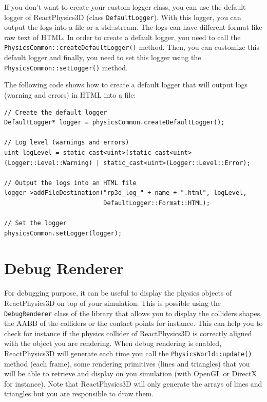 \documentclass[a4paper,12pt]{article}
\begin{document}
    \begin{sloppypar}
    If you don't want to create your custom logger class, you can use the default logger of ReactPhysics3D (class \texttt{DefaultLogger}). With this
    logger, you can output the logs into
    a file or a std::stream. The logs can have different format like raw text of HTML. In order to create a default logger, you need to call the
    \texttt{PhysicsCommon::createDefaultLogger()} method. Then, you can customize this default logger and finally, you need to set this logger using the
    \texttt{PhysicsCommon::setLogger()} method. \\
    \end{sloppypar}

    The following code shows how to create a default logger that will output logs (warning and errors) in HTML into a file: \\

    \begin{lstlisting}
// Create the default logger
DefaultLogger* logger = physicsCommon.createDefaultLogger();

// Log level (warnings and errors)
uint logLevel = static_cast<uint>(static_cast<uint>(Logger::Level::Warning) | static_cast<uint>(Logger::Level::Error);

// Output the logs into an HTML file
logger->addFileDestination("rp3d_log_" + name + ".html", logLevel,
                           DefaultLogger::Format::HTML);

// Set the logger
physicsCommon.setLogger(logger);
    \end{lstlisting}

   \section{Debug Renderer}
  
  \begin{sloppypar}
   For debugging purpose, it can be useful to display the physics objects of ReactPhysics3D on top of your simulation. This is possible using the
   \texttt{DebugRenderer} class of the library that allows you to display the colliders shapes, the AABB of the colliders or the contact points for
   instance. This can help you to check for instance if the physics collider of ReactPhysics3D is correctly aligned with the object you are rendering.
   When debug rendering is enabled, ReactPhysics3D will generate each time you call the \texttt{PhysicsWorld::update()} method (each frame), some rendering
   primitives (lines and triangles) that you will be able to retrieve and display on you simulation (with OpenGL or DirectX for instance). Note that
   ReactPhysics3D will only generate the arrays of lines and triangles but you are responsible to draw them. \\
  \end{sloppypar}
\end{document}
